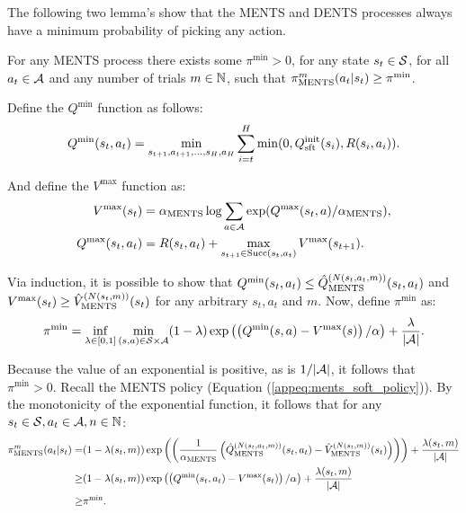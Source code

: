     
    The following two lemma's show that the MENTS and DENTS processes always have a minimum probability of picking any action. 
    \begin{lemma} \label{lem:min_prob_ments}
        For any MENTS process there exists some $\pi^{\min}>0$, for any state $s_t\in\mathcal{S}$, for all $a_t\in\mathcal{A}$ and any number of trials $m\in\mathbb{N}$, such that ${\pi^{m}_{{\textnormal{MENTS}}}}(a_t|s_t)\geq\pi^{\min}$.
    \end{lemma}
    \begin{proofoutline}
        Define the $Q^{\min}$ function as follows:
        \begin{align}
            Q^{\min}(s_t,a_t) = \min_{s_{t+1},a_{t+1},...,s_H,a_H} \sum_{i=t}^H \min(0, Q^{\text{init}}_{{\textnormal{sft}}}(s_i), R(s_i,a_i)).
        \end{align}
        
        And define the $V^{\max}$ function as:
        \begin{align}
            V^{\max}(s_t) &= {\alpha_{{\textnormal{MENTS}}}} \log \sum_{a\in\mathcal{A}} \exp (Q^{\max}(s_t,a)/{\alpha_{{\textnormal{MENTS}}}}), \label{appeq:vmax} \\
            Q^{\max}(s_t,a_t) &= R(s_t,a_t)+\max_{s_{t+1}\in{\textnormal{Succ}(s_t,a_t)}} V^{\max}(s_{t+1}).
        \end{align}
        
        Via induction, it is possible to show that $Q^{\min}(s_t,a_t)\leq {\hat{Q}^{(N(s_t,a_t,m))}_{{\textnormal{MENTS}}}}(s_t,a_t)$ and $V^{\max}(s_t)\geq {\hat{V}^{(N(s_t,m))}_{{\textnormal{MENTS}}}}(s_t)$ for any arbitrary $s_t,a_t$ and $m$. Now, define $\pi^{\min}$ as:
        \begin{align}
            \pi^{\min} = \inf_{\lambda\in[0,1]} \min_{(s,a)\in\mathcal{S}\times\mathcal{A}} (1-\lambda) \exp\left(\left(Q^{\min}(s,a)-V^{\max}(s)\right)/\alpha\right) + \frac{\lambda}{|\mathcal{A}|}. \label{eq:pi_min}
        \end{align}
        
        Because the value of an exponential is positive, as is $1/|\mathcal{A}|$, it follows that $\pi^{\min}>0.$ Recall the MENTS policy (Equation (\ref{appeq:ments_soft_policy})). By the monotonicity of the exponential function, it follows that for any $s_t\in\mathcal{S}, a_t\in\mathcal{A}, n\in\mathbb{N}$:
        \begin{align}
            {\pi^{m}_{{\textnormal{MENTS}}}}(a_t|s_t) 
                =& (1-\lambda(s_t,m))\exp\left(\left(\frac{1}{{\alpha_{{\textnormal{MENTS}}}}}\left({\hat{Q}^{(N(s_t,a_t,m))}_{{\textnormal{MENTS}}}}(s_t,a_t)-{\hat{V}^{(N(s_t,m))}_{{\textnormal{MENTS}}}}(s_t)\right)\right)\right) 
                    + \frac{\lambda(s_t,m)}{|\mathcal{A}|} \\
                \geq& (1-\lambda(s_t,m))\exp\left(\left(Q^{\min}(s_t,a_t)-V^{\max}(s_t)\right)/\alpha\right) 
                    + \frac{\lambda(s_t,m)}{|\mathcal{A}|} \\
                \geq& \pi^{\min}.
        \end{align}
    \end{proofoutline}
        
